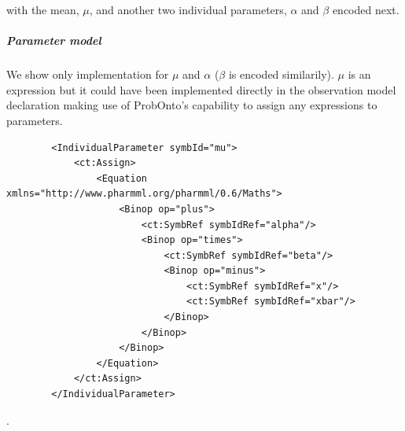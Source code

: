 with the mean, $\mu$, and another two individual parameters, $\alpha$ and 
$\beta$ encoded next.
\subparagraph{Parameter model} We show only implementation for $\mu$ and $\alpha$ 
($\beta$ is encoded similarily). $\mu$ is an expression but it could have been
implemented directly in the observation model declaration making use of ProbOnto's capability
to assign any expressions to parameters.
\lstset{language=XML}
\begin{lstlisting}
        <IndividualParameter symbId="mu">
            <ct:Assign>
                <Equation xmlns="http://www.pharmml.org/pharmml/0.6/Maths">
                    <Binop op="plus">
                        <ct:SymbRef symbIdRef="alpha"/>
                        <Binop op="times">
                            <ct:SymbRef symbIdRef="beta"/>
                            <Binop op="minus">
                                <ct:SymbRef symbIdRef="x"/>
                                <ct:SymbRef symbIdRef="xbar"/>
                            </Binop>
                        </Binop>
                    </Binop>
                </Equation>
            </ct:Assign>
        </IndividualParameter>
\end{lstlisting}.

